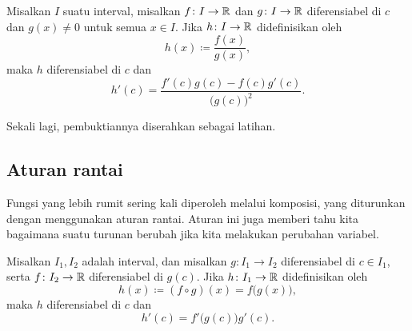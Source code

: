 \begin{prop}
Misalkan $I$ suatu interval, misalkan
$f \colon I \to {\mathbb{R}}$ dan $g \colon I \to {\mathbb{R}}$ diferensiabel di $c$
dan $g(x) \neq 0$ untuk semua $x \in I$.
Jika $h \colon I \to {\mathbb{R}}$
didefinisikan oleh
\begin{equation*}
h(x) \coloneqq \frac{f(x)}{g(x)},
\end{equation*}
maka $h$ diferensiabel di $c$ dan
\begin{equation*}
h'(c) = \frac{f'(c) g(c) - f(c) g'(c)}{{\bigl(g(c)\bigr)}^2} .
\end{equation*}
\end{prop}

Sekali lagi, pembuktiannya diserahkan sebagai latihan.

\subsection{Aturan rantai}

Fungsi yang lebih rumit sering kali diperoleh melalui komposisi,
yang diturunkan dengan menggunakan aturan rantai.  Aturan ini juga memberi tahu kita
bagaimana suatu turunan berubah jika kita melakukan perubahan variabel.

\begin{prop}
Misalkan $I_1, I_2$ adalah interval, dan misalkan
$g \colon I_1 \to I_2$ diferensiabel di $c \in I_1$,
serta
$f \colon I_2 \to {\mathbb{R}}$ diferensiabel di $g(c)$.
Jika $h \colon I_1 \to {\mathbb{R}}$
didefinisikan oleh
\begin{equation*}
h(x) \coloneqq (f \circ g) (x) = f\bigl(g(x)\bigr) ,
\end{equation*}
maka $h$ diferensiabel di $c$ dan
\begin{equation*}
h'(c) = f'\bigl(g(c)\bigr)g'(c) .
\end{equation*}
\end{prop}

